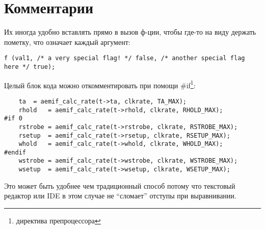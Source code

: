 ﻿\section{Комментарии}

Их иногда удобно вставлять прямо в вызов ф-ции, чтобы где-то на виду держать пометку,
что означает каждый аргумент:

\begin{lstlisting}
f (val1, /* a very special flag! */ false, /* another special flag here */ true);
\end{lstlisting}

Целый блок кода можно откомментировать при помощи \#if\footnote{директива препроцессора}:

\begin{lstlisting}
	ta	= aemif_calc_rate(t->ta, clkrate, TA_MAX);
	rhold	= aemif_calc_rate(t->rhold, clkrate, RHOLD_MAX);
#if 0	
	rstrobe	= aemif_calc_rate(t->rstrobe, clkrate, RSTROBE_MAX);
	rsetup	= aemif_calc_rate(t->rsetup, clkrate, RSETUP_MAX);
	whold	= aemif_calc_rate(t->whold, clkrate, WHOLD_MAX);
#endif	
	wstrobe	= aemif_calc_rate(t->wstrobe, clkrate, WSTROBE_MAX);
	wsetup	= aemif_calc_rate(t->wsetup, clkrate, WSETUP_MAX);
\end{lstlisting}

Это может быть удобнее чем традиционный способ потому что текстовый редактор или IDE в этом случае
не ``сломает'' отступы при выравнивании.

